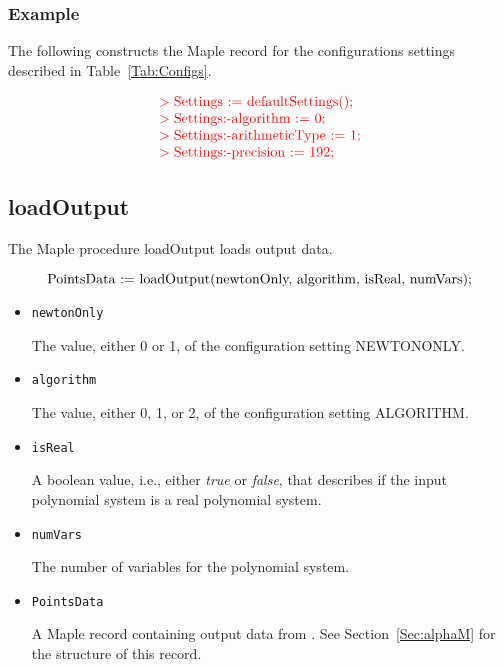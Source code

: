 \documentclass[11pt]{report}
\begin{document}
\subsubsection{Example}

The following constructs the Maple record for the
configurations settings described in Table~\ref{Tab:Configs}.

\[
\begin{color}{red}\begin{array}{l}
> \hbox{Settings := defaultSettings();} \\
> \hbox{Settings:-algorithm := 0;} \\
> \hbox{Settings:-arithmeticType := 1;} \\
> \hbox{Settings:-precision := 192;}
\end{array}\end{color}
\]

\subsection{loadOutput}\label{Sec:OutputM}

The Maple procedure loadOutput loads output data.

\[
\hbox{PointsData := loadOutput(newtonOnly, algorithm, isReal, numVars);}
\]

\begin{itemize}

\item {\tt newtonOnly}

The value, either 0 or 1, of the configuration setting NEWTONONLY.

\item {\tt algorithm}

The value, either 0, 1, or 2, of the configuration setting ALGORITHM.

\item {\tt isReal}

A boolean value, i.e., either {\em true} or {\em false}, that describes
if the input polynomial system is a real polynomial system.

\item {\tt numVars}

The number of variables for the polynomial system.

\item {\tt PointsData}

A Maple record containing output data from \alphaCertified.
See Section~\ref{Sec:alphaM} for the structure of this record.

\end{itemize}
\end{document}
